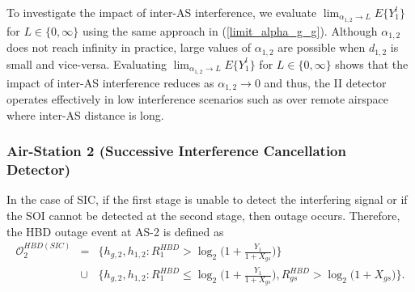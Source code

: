 To investigate the impact of inter-AS interference, we evaluate $\lim_{\alpha_{1,2} \to L} E\{Y_1^l\}$ for $L \in \{0,\infty\}$ using the same approach in (\ref{limit_alpha_g_g}). Although $\alpha_{1,2}$ does not reach infinity in practice, large values of $\alpha_{1,2}$ are possible when $d_{1,2}$ is small and vice-versa. Evaluating $\lim_{\alpha_{1,2} \to L} E\{Y_1^l\}$ for $L \in \{0,\infty\}$ shows that the impact of inter-AS interference reduces as $\alpha_{1,2} \to 0$ and thus, the II detector operates effectively in low interference scenarios such as over remote airspace where inter-AS distance is long.

\subsubsection{Air-Station 2 (Successive Interference Cancellation Detector)}

In the case of SIC, if the first stage is unable to detect the interfering signal or if the SOI cannot be detected at the second stage, then outage occurs. Therefore, the HBD outage event at AS-2 is defined as 
\begin{eqnarray}
\mathcal{O}_{2}^{HBD(SIC)} & = & \bigg\{h_{g,2}, h_{1,2} : R_{1}^{HBD} > \log_{2}\bigg(1+\frac{Y_{1}}{1+X_{gs}}\bigg) \bigg\} \nonumber\\
& \cup & \bigg\{h_{g,2}, h_{1,2} :  R_{1}^{HBD} \leq \log_{2}\bigg(1+\frac{Y_{1}}{1+X_{gs}}\bigg) , R_{gs}^{HBD} > \log_{2}\big(1+X_{gs}\big) \bigg\}. \nonumber\\
\end{eqnarray}


